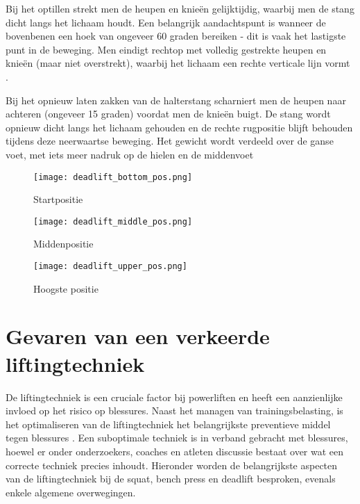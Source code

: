 \medskip

Bij het optillen strekt men de heupen en knieën gelijktijdig, waarbij men de stang dicht langs het lichaam houdt. 
Een belangrijk aandachtspunt is wanneer de bovenbenen een hoek van ongeveer 60 graden bereiken - dit is vaak het lastigste punt in de beweging. 
Men eindigt rechtop met volledig gestrekte heupen en knieën (maar niet overstrekt), waarbij het lichaam een rechte verticale lijn vormt \autocite{Ronai2020}.

\medskip

Bij het opnieuw laten zakken van de halterstang scharniert men de heupen naar achteren (ongeveer 15 graden) voordat men de knieën buigt.
De stang wordt opnieuw dicht langs het lichaam gehouden en de rechte rugpositie blijft behouden tijdens deze neerwaartse beweging.
Het gewicht wordt verdeeld over de ganse voet, met iets meer nadruk op de hielen en de middenvoet \autocite{Ronai2020}

\begin{figure}[h]
  \centering
  \begin{minipage}[t]{0.32\textwidth}
    \centering
    \texttt{[image: deadlift\_bottom\_pos.png]}
    \caption[Startpositie deadlift]{\label{fig:deadlift_startpositie} Startpositie \autocite{Ronai2020}}
  \end{minipage}
  \hfill
  \begin{minipage}[t]{0.32\textwidth}
    \centering
    \texttt{[image: deadlift\_middle\_pos.png]}
    \caption[Middenste positie deadlift]{\label{fig:deadlift_middenpositie} Middenpositie \autocite{Ronai2020}}
  \end{minipage}
  \hfill
  \begin{minipage}[t]{0.32\textwidth}
    \centering
    \texttt{[image: deadlift\_upper\_pos.png]}
    \caption[Hoogste positie deadlift]{\label{fig:deadlift_bovenpositie} Hoogste positie \autocite{Ronai2020}}
  \end{minipage}
\end{figure}

\section{Gevaren van een verkeerde liftingtechniek}
\label{sec:gevaren-verkeerde-liftingtechniek}
De liftingtechniek is een cruciale factor bij powerliften en heeft een aanzienlijke invloed op het risico op blessures. 
Naast het managen van trainingsbelasting, is het optimaliseren van de liftingtechniek het belangrijkste preventieve middel tegen blessures \autocite{StrömbäckEtAl2018}. 
Een suboptimale techniek is in verband gebracht met blessures, hoewel er onder onderzoekers, coaches en atleten discussie bestaat over wat een correcte techniek precies inhoudt. 
Hieronder worden de belangrijkste aspecten van de liftingtechniek bij de squat, bench press en deadlift besproken, evenals enkele algemene overwegingen.

